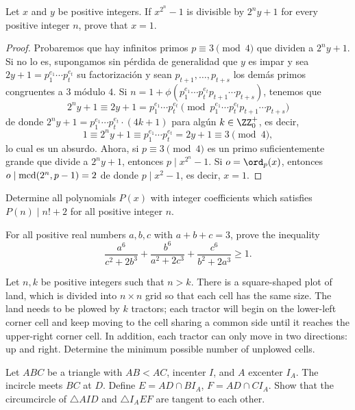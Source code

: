 
\begin{probHR}[ISL 2012/N6]
  Let $x$ and $y$ be positive integers. If $x^{2^n}-1$ is divisible by $2^ny+1$
  for every positive integer $n$, prove that $x=1$.
\end{probHR}

\begin{proof}
  Probaremos que hay infinitos primos $p\equiv 3\pmod 4$ que dividen a $2^ny+1$.
  Si no lo es, supongamos sin pérdida de generalidad que $y$ es impar y sea
  $2y+1=p_1^{e_1}\cdots p_t^{e_t}$ su factorización y sean
  $p_{t+1},\dots,p_{t+s}$ los demás primos congruentes a $3$ módulo $4$. Si
  $n=1+\phi(p_1^{e_1}\cdots p_t^{e_t}p_{t+1}\cdots p_{t+s})$, tenemos que
  \[
    2^ny+1
    \equiv 2y+1
    =p_1^{e_1}\cdots p_t^{e_t}\pmod{p_1^{e_1}\cdots p_t^{e_t}p_{t+1}\cdots p_{t+s}}
  \]
  de donde $2^ny+1=p_1^{e_1}\cdots p_t^{e_t}\cdot(4k+1)$ para algún
  $k\in\ZZ^+_0$, es decir,
  \[1\equiv 2^ny+1\equiv p_1^{e_1}\cdots p_t^{e_t}=2y+1\equiv 3\pmod 4,\]
  lo cual es un absurdo. Ahora, si $p\equiv 3\pmod 4$ es un primo
  suficientemente grande que divide a $2^ny+1$, entonces $p\mid x^{2^n}-1$. Si
  $o=\ord_{p}(x)$, entonces $o\mid\operatorname{mcd}(2^n,p-1)=2$ de donde $p\mid x^2-1$, es
  decir, $x=1$.
\end{proof}


\begin{probEG}[Thailand MO 2020/10]
  Determine all polynomials $P(x)$ with integer coefficients which satisfies
  $P(n)\mid n!+2$ for all positive integer $n$.
\end{probEG}

\begin{probEG}[Thailand MO 2020/8]
  For all positive real numbers $a,b,c$ with $a+b+c=3$, prove the inequality
  \[\frac{a^6}{c^2+2b^3}+\frac{b^6}{a^2+2c^3}+\frac{c^6}{b^2+2a^3}\ge 1.\]
\end{probEG}

\begin{probEG}[Thailand MO 2020/9]
  Let $n,k$ be positive integers such that $n>k$. There is a square-shaped plot
  of land, which is divided into $n\times n$ grid so that each cell has the same
  size. The land needs to be plowed by $k$ tractors; each tractor will begin on
  the lower-left corner cell and keep moving to the cell sharing a common side
  until it reaches the upper-right corner cell. In addition, each tractor can
  only move in two directions: up and right. Determine the minimum possible
  number of unplowed cells.
\end{probEG}

\begin{probMG}[ISL 2020/G6]
  Let $ABC$ be a triangle with $AB<AC$, incenter $I$, and $A$ excenter $I_A$.
  The incircle meets $BC$ at $D$. Define $E=AD\cap BI_A$, $F=AD\cap CI_A$. Show
  that the circumcircle of $\triangle AID$ and $\triangle I_AEF$ are tangent to
  each other.
\end{probMG}
